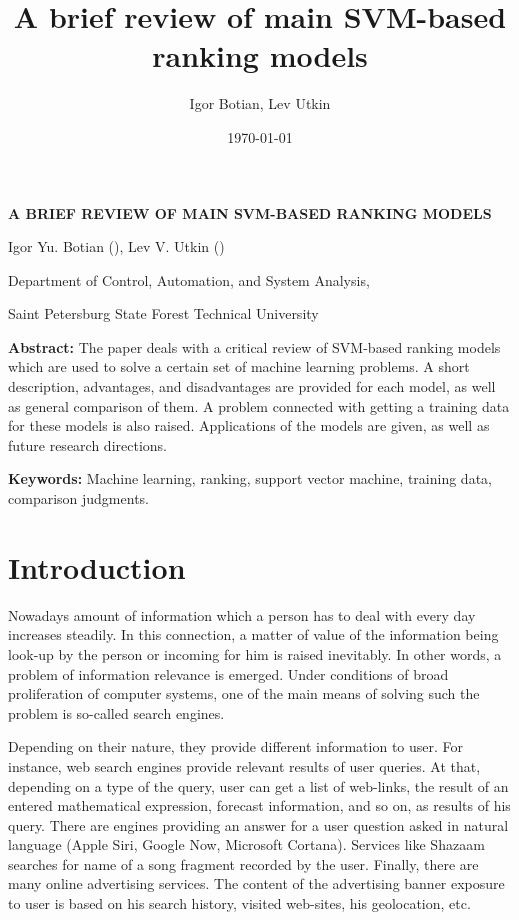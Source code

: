 \documentclass[12pt,a4paper,oneside]{article}
\title{A brief review of main SVM-based ranking models}
\author{Igor Botian, Lev Utkin}
\date{\today}
\begin{document}

\ApplyCommonPageStyle


\centerline{\large \textbf{A BRIEF REVIEW OF MAIN SVM-BASED RANKING MODELS}}

\vspace*{1em}

\centerline{Igor Yu. Botian (), Lev V. Utkin ()}
\centerline{Department of Control, Automation, and System Analysis,}
\centerline{Saint Petersburg State Forest Technical University}

\vspace*{1em}

\par
{\small %
	\textbf{Abstract:} The paper deals with a critical review of SVM-based ranking models which are used to solve a certain set of machine learning problems. 
	A short description, advantages, and disadvantages are provided for each model, as well as general comparison of them. 
	A problem connected with getting a training data for these models is also raised. Applications of the models are given, as well as future research directions. 
}

\par
{\footnotesize %
	\textbf{Keywords:} Machine learning, ranking, support vector machine, training data, comparison judgments.
}


\section{Introduction}
\label{sec:introduction}

\par
Nowadays amount of information which a person has to deal with every day increases steadily. 
In this connection, a matter of value of the information being look-up by the person or incoming for him is raised inevitably. 
In other words, a problem of information relevance is emerged. 
Under conditions of broad proliferation of computer systems, one of the main means of solving such the problem is so-called search engines. 

\par
Depending on their nature, they provide different information to user. 
For instance, web search engines provide relevant results of user queries. 
At that, depending on a type of the query, user can get a list of web-links, the result of an entered mathematical expression, forecast information, and so on, as results of his query. 
There are engines providing an answer for a user question asked in natural language (Apple Siri, Google Now, Microsoft Cortana). 
Services like Shazaam searches for name of a song fragment recorded by the user. 
Finally, there are many online advertising services. 
The content of the advertising banner exposure to user is based on his search history, visited web-sites, his geolocation, etc.
\end{document}
